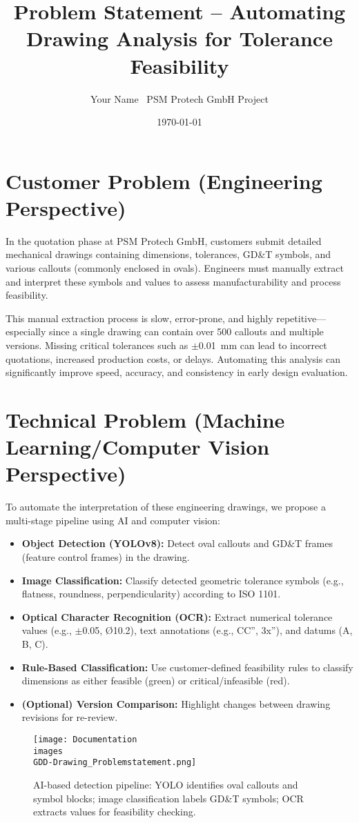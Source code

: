 \documentclass[a4paper,12pt]{article}
\title{\textbf{Problem Statement – Automating Drawing Analysis for Tolerance Feasibility}} \author{Your Name \ PSM Protech GmbH Project} \date{\today}
\begin{document}
\maketitle

\section*{Customer Problem (Engineering Perspective)}

In the quotation phase at PSM Protech GmbH, customers submit detailed mechanical drawings containing dimensions, tolerances, GD&T symbols, and various callouts (commonly enclosed in ovals). Engineers must manually extract and interpret these symbols and values to assess manufacturability and process feasibility.

This manual extraction process is slow, error-prone, and highly repetitive—especially since a single drawing can contain over 500 callouts and multiple versions. Missing critical tolerances such as $\pm$0.01~mm can lead to incorrect quotations, increased production costs, or delays. Automating this analysis can significantly improve speed, accuracy, and consistency in early design evaluation.

\section*{Technical Problem (Machine Learning/Computer Vision Perspective)}

To automate the interpretation of these engineering drawings, we propose a multi-stage pipeline using AI and computer vision:

\begin{itemize} \item \textbf{Object Detection (YOLOv8):} Detect oval callouts and GD&T frames (feature control frames) in the drawing. \item \textbf{Image Classification:} Classify detected geometric tolerance symbols (e.g., flatness, roundness, perpendicularity) according to ISO 1101. \item \textbf{Optical Character Recognition (OCR):} Extract numerical tolerance values (e.g., $\pm$0.05, Ø10.2), text annotations (e.g., CC'', 3x''), and datums (A, B, C). \item \textbf{Rule-Based Classification:} Use customer-defined feasibility rules to classify dimensions as either feasible (green) or critical/infeasible (red). \item \textbf{(Optional) Version Comparison:} Highlight changes between drawing revisions for re-review. \end{itemize}

\begin{figure}[h!] \centering \texttt{[image: Documentation\\images\\GDD-Drawing\_Problemstatement.png]} \caption{AI-based detection pipeline: YOLO identifies oval callouts and symbol blocks; image classification labels GD&T symbols; OCR extracts values for feasibility checking.} \label{fig:pipeline_example} \end{figure}
\end{document}
